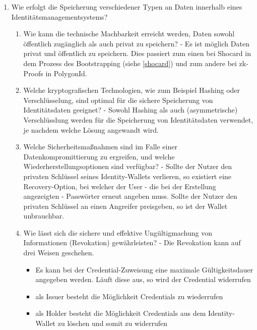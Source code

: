 \begin{enumerate}
	\item Wie erfolgt die Speicherung verschiedener Typen an Daten innerhalb eines Identitätsmanagementsystems?
	\begin{enumerate}
		\item Wie kann die technische Machbarkeit erreicht werden, Daten sowohl öffentlich zugänglich als auch privat zu speichern? - Es ist möglich Daten privat und öffentlich zu speichern. Dies passiert zum einen bei Shocard in dem Prozess des Bootstrapping (siehe \ref{shocard}) und zum andere bei zk-Proofs in PolygonId.
		
		\item Welche kryptografischen Technologien, wie zum Beispiel Hashing oder Verschlüsselung, sind optimal für die sichere Speicherung von Identitätsdaten geeignet? - Sowohl Hashing als auch (asymmetrische) Verschlüsslung werden für die Speicherung von Identitätsdaten verwendet, je nachdem welche Lösung angewandt wird.
		
		 
		\item Welche Sicherheitsmaßnahmen sind im Falle einer Datenkompromittierung zu ergreifen, und welche Wiederherstellungsoptionen sind verfügbar? - Sollte der Nutzer den privaten Schlüssel seines Identity-Wallets verlieren, so existiert eine Recovery-Option, bei welcher der User - die bei der Erstellung angezeigten - Passwörter erneut angeben muss. Sollte der Nutzer den privaten Schlüssel an einen Angreifer preisgeben, so ist der Wallet unbrauchbar.
		
		\item Wie lässt sich die sichere und effektive Ungültigmachung von Informationen (Revokation) gewährleisten? - Die Revokation kann auf drei Weisen geschehen.
		
		\begin{itemize}
			
			\item Es kann bei der Credential-Zuweisung eine maximale Gültigkeitsdauer angegeben werden. Läuft diese aus, so wird der Credential widerrufen
			
			\item als Issuer besteht die Möglichkeit Credentials zu wiederrufen
			
			\item als Holder besteht die Möglichkeit Credentials aus dem Identity-Wallet zu löschen und somit zu widerrufen
			
		\end{itemize}
		 

\end{enumerate}
\end{enumerate}
